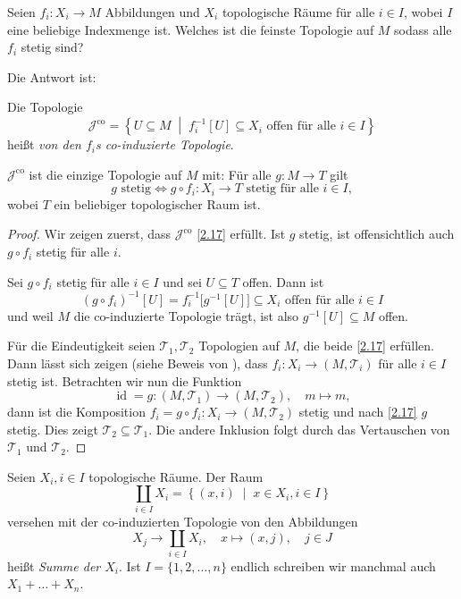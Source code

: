 \documentclass[
12pt, 
openany, 
a4paper, 
final,
fleqn, 
]{myclass}
\numberwithin{equation}{chapter}
\numberwithin{section}{chapter}
\newcommand{\varJ}{\mathcal J}
\newcommand{\varT}{\mathcal T}
\newcommand{\set}[2]{\left\{#1\;\middle|\;#2\right\}}
\DeclareMathOperator{\id}{id}
\begin{document}
Seien $f_{i}: X_{i}\to M$ Abbildungen und $X_{i}$ topologische Räume für alle $i\in I$, wobei $I$ eine beliebige Indexmenge ist. Welches ist die feinste Topologie auf $ M $ sodass alle $f_{i}$ stetig sind?

Die Antwort ist: 
\begin{defn}\label{DefCoinducedTopo}
Die Topologie
\begin{equation}\label{2.15}
\varJ^{\operatorname{co}} = \set{U\subseteq M}{f_{i}^{-1}[U]\subseteq X_{i} \text{ offen für alle $i\in I$}}
\end{equation}
heißt \emph{von den $f_i$s co-induzierte Topologie}. 
\end{defn}

\begin{thr}\label{2.16}
$ \varJ^{\operatorname{co}} $ ist die einzige Topologie auf $M$ mit: Für alle $g: M \to T$ gilt
\begin{equation}\label{2.17}
g\text{ stetig}\iff g\circ f_{i}:X_{i}\to T \text{ stetig für alle $i\in I$}, 
\end{equation}
wobei $T$ ein beliebiger topologischer Raum ist. 
\end{thr}

\begin{proof}
Wir zeigen zuerst, dass $ \varJ^{\operatorname{co}} $ \eqref{2.17} erfüllt. Ist $g$ stetig, ist offensichtlich auch $ g\circ f_{i}$ stetig für alle $i$. 

Sei $g\circ f_{i}$ stetig für alle $i\in I$ und sei $U\subseteq T$ offen. Dann ist 
\[ 
(g\circ f_{i})^{-1}[U] = f_{i}^{-1}\bigg[g^{-1}[U]\bigg] \subseteq X_{i} \text{ offen für alle $i\in I$}
\]
und weil $ M $ die co-induzierte Topologie trägt, ist also $ g^{-1}[U]\subseteq M $ offen.

Für die Eindeutigkeit seien $ \varT_{1}, \varT_{2} $ Topologien auf $ M $, die beide \eqref{2.17} erfüllen. Dann lässt sich zeigen (siehe Beweis von ), dass $ f_{i}:X_{i}\to (M, \varT_{i}) $ für alle $ i\in I $ stetig ist. Betrachten wir nun die Funktion
\[
\id = g: (M, \varT_1) \to (M, \varT_2), \quad m\mapsto m, 
\]
dann ist die Komposition $ f_{i}= g\circ f_{i}: X_{i} \to (M, \varT_{2}) $ stetig und nach \eqref{2.17} $g$ stetig. Dies zeigt $ \varT_{2}\subseteq \varT_{1} $. Die andere Inklusion folgt durch das Vertauschen von $ \varT_{1} $ und $ \varT_2 $. 
\end{proof}

\begin{defn}\label{2.18}
Seien $X_i, i\in I$ topologische Räume. Der Raum 
\begin{equation}\label{SummeDef}
\coprod_{i\in I} X_{i} = \set{(x, i)}{x\in X_{i}, i\in I}
\end{equation}
versehen mit der co-induzierten Topologie von den Abbildungen 
\begin{equation}\label{ProjektionAufSumme}
X_{j} \to \coprod_{i\in I} X_{i}, \quad x \mapsto (x, j), \quad j\in J
\end{equation}
heißt \emph{Summe der $ X_{i} $}. Ist $I=\{1,2,\dots,n\}$ endlich schreiben wir manchmal auch $X_{1}+\dots + X_{n}$. 
\end{defn}
\end{document}
